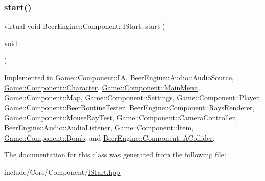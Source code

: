 \subsubsection{\texorpdfstring{start()}{start()}}
{\footnotesize\ttfamily virtual void Beer\+Engine\+::\+Component\+::\+I\+Start\+::start (\begin{DoxyParamCaption}\item[{void}]{ }\end{DoxyParamCaption})\hspace{0.3cm}{\ttfamily [pure virtual]}}



Implemented in \mbox{\hyperlink{class_game_1_1_component_1_1_i_a_ab440dc76a8837e291f6545e0dd15c819}{Game\+::\+Component\+::\+IA}}, \mbox{\hyperlink{class_beer_engine_1_1_audio_1_1_audio_source_aa50a60f2ff5540c9e4506b0ae001c98e}{Beer\+Engine\+::\+Audio\+::\+Audio\+Source}}, \mbox{\hyperlink{class_game_1_1_component_1_1_character_ab5ffa080b89ab20becf30a27a881d4d4}{Game\+::\+Component\+::\+Character}}, \mbox{\hyperlink{class_game_1_1_component_1_1_main_menu_a9043ca6c0ead0ef5fc048ac84171b597}{Game\+::\+Component\+::\+Main\+Menu}}, \mbox{\hyperlink{class_game_1_1_component_1_1_map_a76e2153b5f69646ba7cf77b6cd0f5096}{Game\+::\+Component\+::\+Map}}, \mbox{\hyperlink{class_game_1_1_component_1_1_settings_adc79077ed00bee2d8ed987ea4b86a331}{Game\+::\+Component\+::\+Settings}}, \mbox{\hyperlink{class_game_1_1_component_1_1_player_a317e5d073713ea27ceffe5de642240a6}{Game\+::\+Component\+::\+Player}}, \mbox{\hyperlink{class_game_1_1_component_1_1_beer_routine_tester_a7c721d466c33fd0a34e65707f55272a2}{Game\+::\+Component\+::\+Beer\+Routine\+Tester}}, \mbox{\hyperlink{class_beer_engine_1_1_component_1_1_rays_renderer_a309d7940148feada1c9497e2444a6548}{Beer\+Engine\+::\+Component\+::\+Rays\+Renderer}}, \mbox{\hyperlink{class_game_1_1_component_1_1_mouse_ray_test_ae0d25b167dd28084ddd677b0593a54f3}{Game\+::\+Component\+::\+Mouse\+Ray\+Test}}, \mbox{\hyperlink{class_game_1_1_component_1_1_camera_controller_afe64421588babbf921d77756fa38a48b}{Game\+::\+Component\+::\+Camera\+Controller}}, \mbox{\hyperlink{class_beer_engine_1_1_audio_1_1_audio_listener_a1d4d5e21f30edb7dba64e87f0712c3b3}{Beer\+Engine\+::\+Audio\+::\+Audio\+Listener}}, \mbox{\hyperlink{class_game_1_1_component_1_1_item_a69276f0e6bbd44144a5618cfe89f526a}{Game\+::\+Component\+::\+Item}}, \mbox{\hyperlink{class_game_1_1_component_1_1_bomb_a74e5f8e628a9d434f0faf91273f33990}{Game\+::\+Component\+::\+Bomb}}, and \mbox{\hyperlink{class_beer_engine_1_1_component_1_1_a_collider_a5da2e0713f11237c7a963295f508cd3b}{Beer\+Engine\+::\+Component\+::\+A\+Collider}}.



The documentation for this class was generated from the following file\+:\begin{DoxyCompactItemize}
\item 
include/\+Core/\+Component/\mbox{\hyperlink{_i_start_8hpp}{I\+Start.\+hpp}}\end{DoxyCompactItemize}
